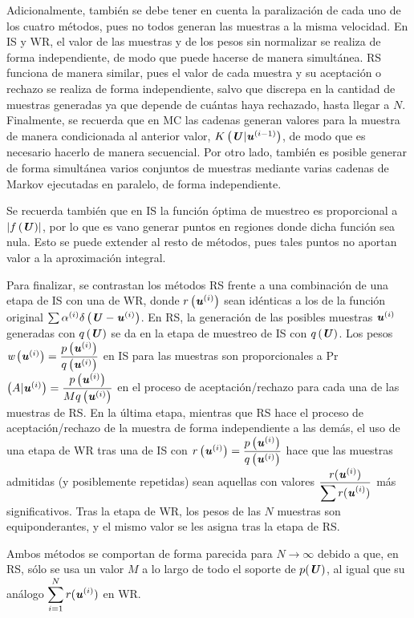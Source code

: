 Adicionalmente, también se debe tener en cuenta la paralización de cada uno de los cuatro métodos, pues no todos generan las muestras a la misma velocidad.
En IS y WR, el valor de las muestras y de los pesos sin normalizar se realiza de forma independiente, de modo que puede hacerse de manera simultánea. RS funciona de manera similar, pues el valor de cada muestra y su aceptación o rechazo se realiza de forma independiente, salvo que discrepa en la cantidad de muestras generadas ya que depende de cuántas haya rechazado, hasta llegar a $N$. Finalmente, se recuerda que en MC las cadenas generan valores para la muestra de manera condicionada al anterior valor, $K\left(\textbf{\textit{U}}|\textbf{\textit{u}}^{(i-1)}\right)$, de modo que es necesario hacerlo de manera secuencial. Por otro lado, también es posible generar de forma simultánea varios conjuntos de muestras mediante varias cadenas de Markov ejecutadas en paralelo, de forma independiente.

Se recuerda también que en IS la función óptima de muestreo es proporcional a $\lvert f\left(\textbf{\textit{U}}\right)\rvert$, por lo que es vano generar puntos en regiones donde dicha función sea nula. Esto se puede extender al resto de métodos, pues tales puntos no aportan valor a la aproximación integral.

Para finalizar, se contrastan los métodos RS frente a una combinación de una etapa de IS con una de WR, donde $r\left(\textbf{\textit{u}}^{(i)}\right)$ sean idénticas a los de la función original $\sum \alpha^{(i)}\delta\left(\textbf{\textit{U}}-\textbf{\textit{u}}^{(i)}\right)$.
En RS, la generación de las posibles muestras $\textbf{\textit{u}}^{(i)}$ generadas con $q\left(\textbf{\textit{U}}\right)$ se da en la etapa de muestreo de IS con $q\left(\textbf{\textit{U}}\right)$.
Los pesos $\textit{w}\left(\textbf{\textit{u}}^{(i)}\right) = \dfrac{p\left(\textbf{\textit{u}}^{(i)}\right)}{q\left(\textbf{\textit{u}}^{(i)}\right)}$ en IS para las muestras son proporcionales a Pr$\left(A|\textbf{\textit{u}}^{(i)}\right)=\dfrac{p\left(\textbf{\textit{u}}^{(i)}\right)}{Mq\left(\textbf{\textit{u}}^{(i)}\right)}$ en el proceso de aceptación/rechazo para cada una de las muestras de RS.
En la última etapa, mientras que RS hace el proceso de aceptación/rechazo de la muestra de forma independiente a las demás, el uso de una etapa de WR tras una de IS con $r\left(\textbf{\textit{u}}^{(i)}\right)=\dfrac{p\left(\textbf{\textit{u}}^{(i)}\right)}{q\left(\textbf{\textit{u}}^{(i)}\right)}$ hace que las muestras admitidas (y posiblemente repetidas) sean aquellas con valores $\dfrac{r(\textbf{\textit{u}}^{(i)})}{\displaystyle \sum r(\textbf{\textit{u}}^{(i)})}$ más significativos. Tras la etapa de WR, los pesos de las $N$ muestras son equiponderantes, y el mismo valor se les asigna tras la etapa de RS.

Ambos métodos se comportan de forma parecida para $N\rightarrow\infty$ debido a que, en RS, sólo se usa un valor $M$ a lo largo de todo el soporte de $p(\textbf{\textit{U}})$, al igual que su análogo $\displaystyle \sum_{i=1}^N r(\textbf{\textit{u}}^{(i)})$ en WR.


